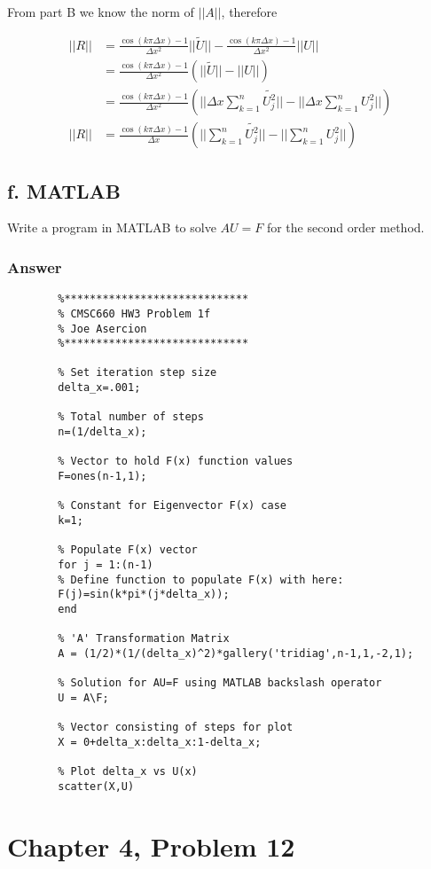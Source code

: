 \documentclass{article}
\begin{document}
		From part B we know the norm of $||A||$, therefore
		
		\begin{align*}
			||R||&=\frac{\cos(k\pi\Delta x)-1}{\Delta x^{2}}||\tilde{U}||-\frac{\cos(k\pi\Delta x)-1}{\Delta x^{2}}||U||\\
			&=\frac{\cos(k\pi\Delta x)-1}{\Delta x^{2}}(||\tilde{U}||-||U||)\\
			&=\frac{\cos(k\pi\Delta x)-1}{\Delta x^{2}}(||\Delta x\sum_{k=1}^{n}\tilde{U_{j}^{2}}||-||\Delta x\sum_{k=1}^{n}U_{j}^{2}||)\\
			||R||&=\frac{\cos(k\pi\Delta x)-1}{\Delta x}(||\sum_{k=1}^{n}\tilde{U_{j}^{2}}||-||\sum_{k=1}^{n}U_{j}^{2}||)
		\end{align*}
	\newpage
	\subsection{f. MATLAB}
		Write a program in MATLAB to solve $AU=F$ for the second order method.
		\subsubsection{Answer}
		\begin{lstlisting}
		%*****************************
		% CMSC660 HW3 Problem 1f
		% Joe Asercion
		%***************************** 
		
		% Set iteration step size
		delta_x=.001;
		
		% Total number of steps
		n=(1/delta_x);
		
		% Vector to hold F(x) function values
		F=ones(n-1,1);
		
		% Constant for Eigenvector F(x) case
		k=1;
		
		% Populate F(x) vector
		for j = 1:(n-1)
		% Define function to populate F(x) with here:
		F(j)=sin(k*pi*(j*delta_x));
		end
		
		% 'A' Transformation Matrix
		A = (1/2)*(1/(delta_x)^2)*gallery('tridiag',n-1,1,-2,1);
		
		% Solution for AU=F using MATLAB backslash operator
		U = A\F;
		
		% Vector consisting of steps for plot
		X = 0+delta_x:delta_x:1-delta_x;
		
		% Plot delta_x vs U(x)
		scatter(X,U)
		\end{lstlisting}
		\newpage
	\section{Chapter 4, Problem 12}
\end{document}
